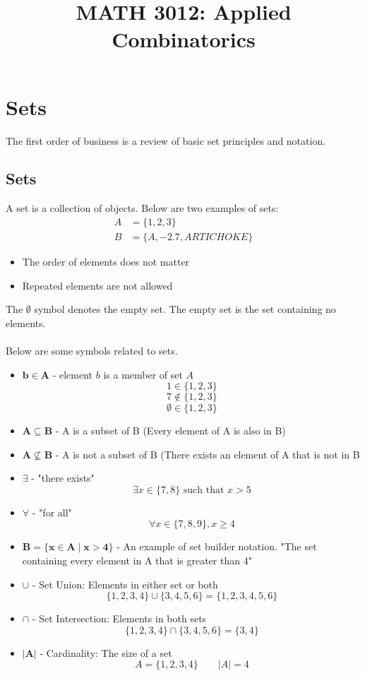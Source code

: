 \documentclass[12pt]{article}
\title{MATH 3012: Applied Combinatorics}
\begin{document}
\pagestyle{fancy}

\section{Sets}
The first order of business is a review of basic set principles and notation.
\subsection{Sets}

A set is a collection of objects. Below are two examples of sets:
\begin{align*}
	A &= \{1, 2, 3\} \\
	B &= \{A, -2.7, ARTICHOKE\}
\end{align*}
\begin{itemize}
	\item The order of elements does not matter
	\item Repeated elements are not allowed
\end{itemize}
The $\emptyset$ symbol denotes the empty set. The empty set is the set containing no elements.\\\\
Below are some symbols related to sets.
\begin{itemize}
	\item
		$\mathbf{b \in A}$ - element $b$ is a member of set $A$ \\
		$$1 \in \{1, 2, 3\}$$
		$$7 \not\in \{1, 2, 3\}$$
		$$\emptyset \in \{1, 2, 3\}$$
	\item
		$\mathbf{A \subseteq B}$ - A is a subset of B (Every element of A is also in B)
	\item
		$\mathbf{A \not\subseteq B}$ - A is not a subset of B (There exists an element of A that is not in B
	\item
		$\mathbf{\exists}$ - "there exists" \\
		$$\exists x \in \{7, 8\} \text{ such that } x > 5$$
	\item
		$\mathbf{\forall}$ - "for all" \\
		$$\forall x \in \{7, 8, 9\}, x \geq 4$$
	\item
		$\mathbf{B = \{x \in A \mid x > 4\}}$ - An example of set builder notation. "The set containing every element in A that is greater than 4"
	\item
		$\mathbf{\cup}$ - Set Union: Elements in either set or both\\
		$$ \{1, 2, 3, 4\} \cup \{3, 4, 5, 6\} = \{1, 2, 3, 4, 5, 6\} $$
	\item
		$\mathbf{\cap}$ - Set Intersection: Elements in both sets\\
		$$ \{1, 2, 3, 4\} \cap \{3, 4, 5, 6\} = \{3, 4\} $$
	\item
		$\mathbf{|A|}$ - Cardinality: The size of a set\\
		$$ A = \{1, 2, 3, 4\} \qquad |A| = 4$$
\end{itemize}
\end{document}
